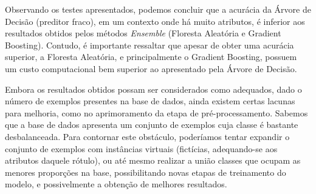 \documentclass[12pt]{article}
\begin{document}
Observando os testes apresentados, podemos concluir que a acurácia da Árvore de Decisão (preditor fraco), em um contexto onde há muito atributos, é inferior aos resultados obtidos pelos métodos \emph{Ensemble} (Floresta Aleatória e Gradient Boosting). Contudo, é importante ressaltar que apesar de obter uma acurácia superior, a Floresta Aleatória, e principalmente o Gradient Boosting, possuem um custo computacional bem superior ao apresentado pela Árvore de Decisão. 

Embora os resultados obtidos possam ser considerados como adequados, dado o número de exemplos presentes na base de dados, ainda existem certas lacunas para melhoria, como no aprimoramento da etapa de pré-processamento. Sabemos que a base de dados apresenta um conjunto de exemplos cuja classe é bastante desbalanceada. Para contornar este obstáculo, poderíamos tentar expandir o conjunto de exemplos com instâncias virtuais (fictícias, adequando-se aos atributos daquele rótulo), ou até mesmo realizar a união classes que ocupam as menores proporções na base, possibilitando novas etapas de treinamento do modelo, e possivelmente a obtenção de melhores resultados.



\end{document}
